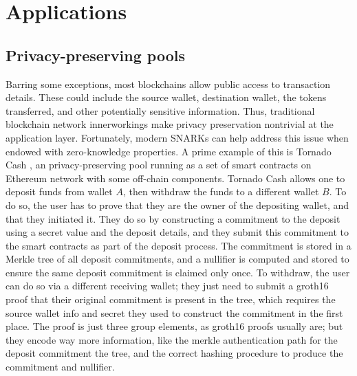 \section{Applications}

\subsection{Privacy-preserving pools}
\noindent Barring some exceptions, most blockchains allow public access to transaction details. These could include the source wallet, destination wallet, the tokens transferred, and other potentially sensitive information. Thus, traditional blockchain network innerworkings make privacy preservation nontrivial at the application layer. Fortunately, modern SNARKs can help address this issue when endowed with zero-knowledge properties. A prime example of this is Tornado Cash \cite{tornadocash}, an privacy-preserving pool running as a set of smart contracts on Ethereum network with some off-chain components. Tornado Cash allows one to deposit funds from wallet $A$, then withdraw the funds to a different wallet $B$. To do so, the user has to prove that they are the owner of the depositing wallet, and that they initiated it. They do so by constructing a commitment to the deposit using a secret value and the deposit details, and they submit this commitment to the smart contracts as part of the deposit process. The commitment is stored in a Merkle tree of all deposit commitments, and a nullifier is computed and stored to ensure the same deposit commitment is claimed only once. To withdraw, the user can do so via a different receiving wallet; they just need to submit a groth16 proof that their original commitment is present in the tree, which requires the source wallet info and secret they used to construct the commitment in the first place. The proof is just three group elements, as groth16 proofs usually are; but they encode way more information, like the merkle authentication path for the deposit commitment the tree, and the correct hashing procedure to produce the commitment and nullifier.\\

